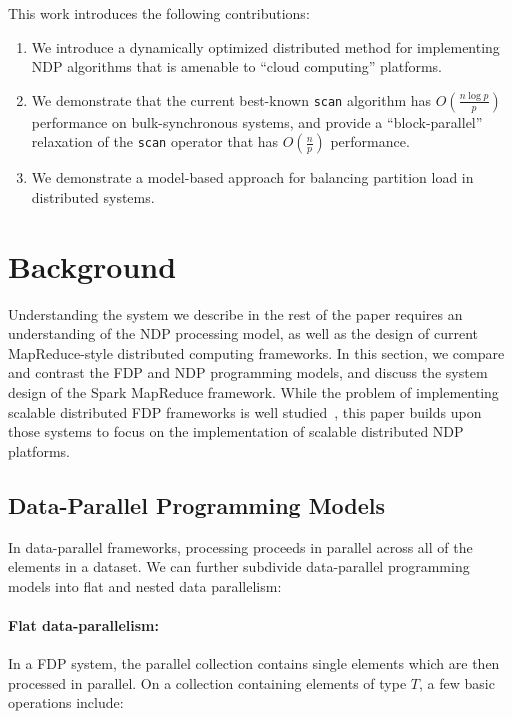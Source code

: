 \documentclass[preprint]{sigplanconf}
\theoremstyle{definition}
\begin{document}
This work introduces the following contributions:

\begin{enumerate}
\item We introduce a dynamically optimized distributed method for implementing NDP algorithms that is
amenable to ``cloud computing'' platforms.
\item We demonstrate that the current best-known \texttt{scan} algorithm has $O(\frac{n \log p}{p})$
performance on bulk-synchronous systems, and provide a ``block-parallel'' relaxation of the \texttt{scan}
operator that has $O(\frac{n}{p})$ performance.
\item We demonstrate a model-based approach for balancing partition load in distributed systems.
\end{enumerate}

\section{Background}
\label{sec:background}

Understanding the system we describe in the rest of the paper requires an understanding of the NDP
processing model, as well as the design of current MapReduce-style distributed computing frameworks.
In this section, we compare and contrast the FDP and NDP programming models, and discuss the
system design of the Spark MapReduce framework. While the problem of implementing scalable
distributed FDP frameworks is well studied~\cite{dean04, zaharia10}, this paper builds upon those
systems to focus on the implementation of scalable distributed NDP platforms.

\subsection{Data-Parallel Programming Models}
\label{sec:data-parallel-programming-models}

In data-parallel frameworks, processing proceeds in parallel across all of the elements in a dataset. We
can further subdivide data-parallel programming models into flat and nested data parallelism:

\paragraph{Flat data-parallelism:}

In a FDP system, the parallel collection contains single elements which are then processed in parallel.
On a collection containing elements of type $T$, a few basic operations include:
\end{document}
